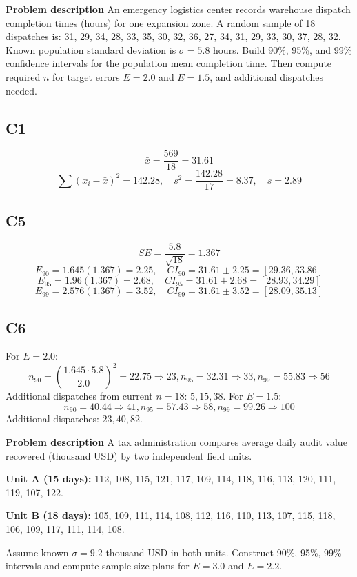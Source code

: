 \begin{ExamProblems}
		\newpage
		\item
		\textbf{Problem description}
		An emergency logistics center records warehouse dispatch completion times (hours) for one expansion zone.
		A random sample of 18 dispatches is:
		31, 29, 34, 28, 33, 35, 30, 32, 36, 27, 34, 31, 29, 33, 30, 37, 28, 32.
		Known population standard deviation is $\sigma=5.8$ hours.
		Build 90\%, 95\%, and 99\% confidence intervals for the population mean completion time.
		Then compute required $n$ for target errors $E=2.0$ and $E=1.5$, and additional dispatches needed.
		
		\subsection*{C1}
		\[
		\bar{x}=\frac{569}{18}=31.61
		\]
		\[
		\sum (x_i-\bar{x})^2=142.28,
		\quad s^2=\frac{142.28}{17}=8.37,
		\quad s=2.89
		\]
		
		\subsection*{C5}
		\[
		SE=\frac{5.8}{\sqrt{18}}=1.367
		\]
		\[
		E_{90}=1.645(1.367)=2.25,\quad CI_{90}=31.61\pm2.25=[29.36,33.86]
		\]
		\[
		E_{95}=1.96(1.367)=2.68,\quad CI_{95}=31.61\pm2.68=[28.93,34.29]
		\]
		\[
		E_{99}=2.576(1.367)=3.52,\quad CI_{99}=31.61\pm3.52=[28.09,35.13]
		\]
		
		\subsection*{C6}
		For $E=2.0$:
		\[
		n_{90}=\left(\frac{1.645\cdot5.8}{2.0}\right)^2=22.75\Rightarrow23,
		n_{95}=32.31\Rightarrow33,
		n_{99}=55.83\Rightarrow56
		\]
		Additional dispatches from current $n=18$: $5,15,38$.
		For $E=1.5$:
		\[
		n_{90}=40.44\Rightarrow41,
		n_{95}=57.43\Rightarrow58,
		n_{99}=99.26\Rightarrow100
		\]
		Additional dispatches: $23,40,82$.

		\newpage
		\item
		\textbf{Problem description}
		A tax administration compares average daily audit value recovered (thousand USD) by two independent field units.
		
		\textbf{Unit A (15 days):} 112, 108, 115, 121, 117, 109, 114, 118, 116, 113, 120, 111, 119, 107, 122.
		
		\textbf{Unit B (18 days):} 105, 109, 111, 114, 108, 112, 116, 110, 113, 107, 115, 118, 106, 109, 117, 111, 114, 108.
		
		Assume known $\sigma=9.2$ thousand USD in both units.
		Construct 90\%, 95\%, 99\% intervals and compute sample-size plans for $E=3.0$ and $E=2.2$.
		

\end{ExamProblems}
